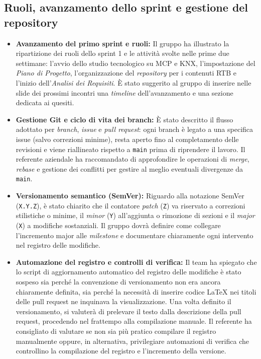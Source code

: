 \documentclass[11pt, a4paper]{article}
\begin{document}
\subsection{Ruoli, avanzamento dello sprint e gestione del repository}
\begin{itemize}
    \item \textbf{Avanzamento del primo sprint e ruoli:} Il gruppo ha illustrato la ripartizione dei ruoli dello sprint 1 e le attività svolte nelle prime due settimane: l'avvio dello studio tecnologico su MCP e KNX, l'impostazione del \textit{Piano di Progetto}, l'organizzazione del \textit{repository} per i contenuti RTB e l'inizio dell'\textit{Analisi dei Requisiti}. È stato suggerito al gruppo di inserire nelle slide dei prossimi incontri una \textit{timeline} dell'avanzamento e una sezione dedicata ai quesiti.
    \item \textbf{Gestione Git e ciclo di vita dei branch:} È stato descritto il flusso adottato per \textit{branch}, \textit{issue} e \textit{pull request}: ogni branch è legato a una specifica issue (salvo correzioni minime), resta aperto fino al completamento delle revisioni e viene riallineato rispetto a \texttt{main} prima di riprendere il lavoro. Il referente aziendale ha raccomandato di approfondire le operazioni di \textit{merge}, \textit{rebase} e gestione dei conflitti per gestire al meglio eventuali divergenze da \texttt{main}.
    \item \textbf{Versionamento semantico (SemVer):} Riguardo alla notazione SemVer (\texttt{X.Y.Z}), è stato chiarito che il contatore \textit{patch} (\texttt{Z}) va riservato a correzioni stilistiche o minime, il \textit{minor} (\texttt{Y}) all'aggiunta o rimozione di sezioni e il \textit{major} (\texttt{X}) a modifiche sostanziali. Il gruppo dovrà definire come collegare l'incremento major alle \textit{milestone} e documentare chiaramente ogni intervento nel registro delle modifiche.
    \item \textbf{Automazione del registro e controlli di verifica:} Il team ha spiegato che lo script di aggiornamento automatico del registro delle modifiche è stato sospeso sia perché la convenzione di versionamento non era ancora chiaramente definita, sia perché la necessità di inserire codice LaTeX nei titoli delle pull request ne inquinava la visualizzazione. Una volta definito il versionamento, si valuterà di prelevare il testo dalla descrizione della pull request, procedendo nel frattempo alla compilazione manuale. Il referente ha consigliato di valutare se non sia più pratico compilare il registro manualmente oppure, in alternativa, privilegiare automazioni di verifica che controllino la compilazione del registro e l'incremento della versione.
\end{itemize}
\end{document}
